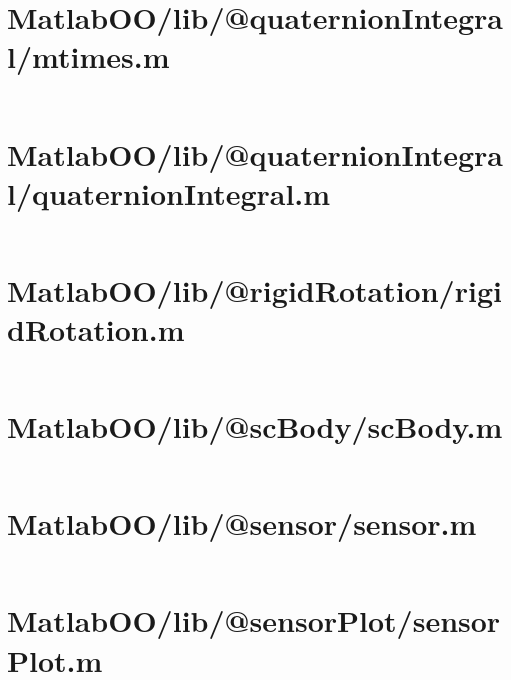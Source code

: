 \pagebreak
\section*{MatlabOO/lib/@quaternionIntegral/mtimes.m}\label{code:MatlabOO/lib/@quaternionIntegral/mtimes.m}
\inputminted[linenos,fontsize=\scriptsize]{matlab}{/home/dcouture/git/mathyourlife/TSatPy/beta_versions/matlab_object_oriented/lib/@quaternionIntegral/mtimes.m}

\pagebreak
\section*{MatlabOO/lib/@quaternionIntegral/quaternionIntegral.m}\label{code:MatlabOO/lib/@quaternionIntegral/quaternionIntegral.m}
\inputminted[linenos,fontsize=\scriptsize]{matlab}{/home/dcouture/git/mathyourlife/TSatPy/beta_versions/matlab_object_oriented/lib/@quaternionIntegral/quaternionIntegral.m}

\pagebreak
\section*{MatlabOO/lib/@rigidRotation/rigidRotation.m}\label{code:MatlabOO/lib/@rigidRotation/rigidRotation.m}
\inputminted[linenos,fontsize=\scriptsize]{matlab}{/home/dcouture/git/mathyourlife/TSatPy/beta_versions/matlab_object_oriented/lib/@rigidRotation/rigidRotation.m}

\pagebreak
\section*{MatlabOO/lib/@scBody/scBody.m}\label{code:MatlabOO/lib/@scBody/scBody.m}
\inputminted[linenos,fontsize=\scriptsize]{matlab}{/home/dcouture/git/mathyourlife/TSatPy/beta_versions/matlab_object_oriented/lib/@scBody/scBody.m}

\pagebreak
\section*{MatlabOO/lib/@sensor/sensor.m}\label{code:MatlabOO/lib/@sensor/sensor.m}
\inputminted[linenos,fontsize=\scriptsize]{matlab}{/home/dcouture/git/mathyourlife/TSatPy/beta_versions/matlab_object_oriented/lib/@sensor/sensor.m}

\pagebreak
\section*{MatlabOO/lib/@sensorPlot/sensorPlot.m}\label{code:MatlabOO/lib/@sensorPlot/sensorPlot.m}
\inputminted[linenos,fontsize=\scriptsize]{matlab}{/home/dcouture/git/mathyourlife/TSatPy/beta_versions/matlab_object_oriented/lib/@sensorPlot/sensorPlot.m}

